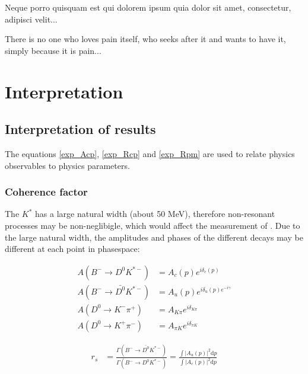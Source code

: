 \clearpage
\begin{savequote}[8cm]
\textlatin{Neque porro quisquam est qui dolorem ipsum quia dolor sit amet, consectetur, adipisci velit...}

There is no one who loves pain itself, who seeks after it and wants to have it, simply because it is pain...
\end{savequote}

\chapter{\label{ch:9-interpretation}Interpretation} 

\minitoc

\section{Interpretation of results}
\label{sec:interpretation}

The equations \ref{exp_Acp}, \ref{exp_Rcp} and \ref{exp_Rpm} are used to relate physics observables to physics parameters. 

\subsection{Coherence factor}
\label{sec:interpretation:coherence}

The $K^*$ has a large natural width (about 50 MeV), therefore non-resonant processes may be non-neglibigle, which would affect the measurement of \Pgamma. Due to the large natural width, the amplitudes and phases of the different decays may be different at each point in phasespace:

\begin{align*}
A(B^- \to D^0 K^{*-}) &= A_c(p) e^{i\delta_c(p)} \\
A(B^- \to \bar{D^0} K^{*-}) &= A_u(p) e^{i\delta_u(p) e^{-i\gamma}} \\
A(D^0 \to K^-\pi^+) &= A_{K\pi} e^{i\delta_{K\pi}} \\
A(D^0 \to K^+\pi^-) &= A_{{\pi}K} e^{i\delta_{{\pi}K}} 
\end{align*}

\begin{align*}
r_s &= \frac{\Gamma(B^- \to \bar{D^0}K^{*-})}{\Gamma(B^- \to D^0K^{*-})} = \frac{\int \left|A_u(p)\right|^2 \mathrm{d}p}{\int \left|A_c(p)\right|^2 \mathrm{d}p}
\end{align*}

